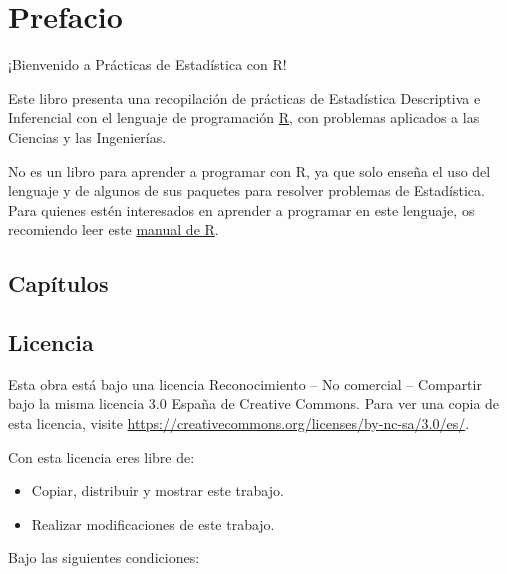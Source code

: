 \documentclass[
  a4paper,
]{scrreport}
\providecommand{\tightlist}{%
  \setlength{\itemsep}{0pt}\setlength{\parskip}{0pt}}\usepackage{longtable,booktabs,array}
\theoremstyle{definition}
\theoremstyle{remark}
\begin{document}
\hypertarget{prefacio}{%
\chapter*{Prefacio}\label{prefacio}}


¡Bienvenido a Prácticas de Estadística con R!

Este libro presenta una recopilación de prácticas de Estadística
Descriptiva e Inferencial con el lenguaje de programación
\href{https://www.r-project.org/}{R}, con problemas aplicados a las
Ciencias y las Ingenierías.

No es un libro para aprender a programar con R, ya que solo enseña el
uso del lenguaje y de algunos de sus paquetes para resolver problemas de
Estadística. Para quienes estén interesados en aprender a programar en
este lenguaje, os recomiendo leer este
\href{https://aprendeconalf.es/manual-r/}{manual de R}.

\hypertarget{capuxedtulos}{%
\section*{Capítulos}\label{capuxedtulos}}


\hypertarget{toc}{}

\hypertarget{licencia}{%
\section*{Licencia}\label{licencia}}


Esta obra está bajo una licencia Reconocimiento -- No comercial --
Compartir bajo la misma licencia 3.0 España de Creative Commons. Para
ver una copia de esta licencia, visite
\url{https://creativecommons.org/licenses/by-nc-sa/3.0/es/}.

Con esta licencia eres libre de:

\begin{itemize}
\tightlist
\item
  Copiar, distribuir y mostrar este trabajo.
\item
  Realizar modificaciones de este trabajo.
\end{itemize}

Bajo las siguientes condiciones:
\end{document}
